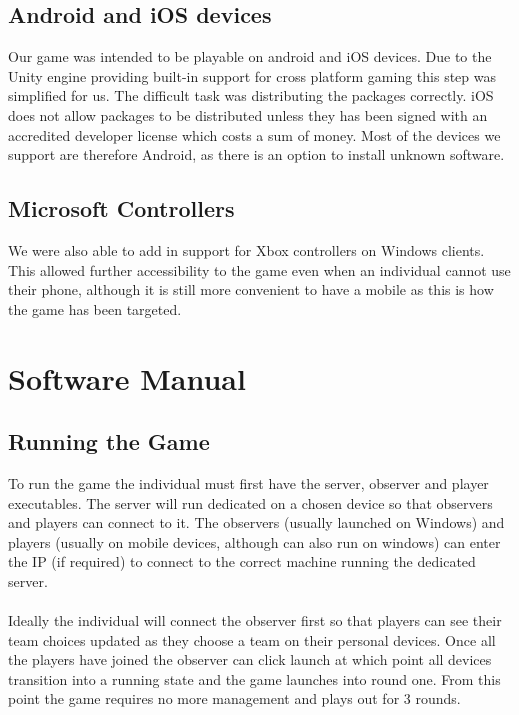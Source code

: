\documentclass[11pt,a4paper]{article}
\begin{document}
 \subsection{Android and iOS devices} 
 Our game was intended to be playable on android and iOS devices. Due to the Unity engine providing built-in support for cross platform gaming this step was simplified for us. The difficult task was distributing the packages correctly. iOS does not allow packages to be distributed unless they has been signed with an accredited developer license which costs a sum of money. Most of the devices we support are therefore Android, as there is an option to install unknown software.

 \subsection{Microsoft Controllers}
  We were also able to add in support for Xbox controllers on Windows clients. This allowed further accessibility to the game even when an individual cannot use their phone, although it is still more convenient to have a mobile as this is how the game has been targeted.


\pagebreak

 \section{Software Manual}

 \subsection{Running the Game}
 To run the game the individual must first have the server, observer and player executables. The server will run dedicated on a chosen device so that observers and players can connect to it. The observers (usually launched on Windows)  and players (usually on mobile devices, although can also run on windows) can enter the IP (if required) to connect to the correct machine running the dedicated server. \\ \\
 Ideally the individual will connect the observer first so that players can see their team choices updated as they choose a team on their personal devices. Once all the players have joined the observer can click launch at which point all devices transition into a running state and the game launches into round one. From this point the game requires no more management and plays out for 3 rounds.
\end{document}
